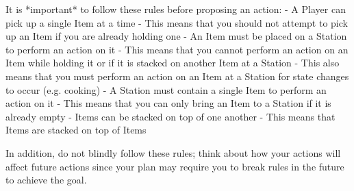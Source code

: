 It is *important* to follow these rules before proposing an action:
    - A Player can pick up a single Item at a time
      - This means that you should not attempt to pick up an Item if you are already holding one
    - An Item must be placed on a Station to perform an action on it
      - This means that you cannot perform an action on an Item while holding it or if it is stacked on another Item at a Station
      - This also means that you must perform an action on an Item at a Station for state changes to occur (e.g. cooking)
    - A Station must contain a single Item to perform an action on it
      - This means that you can only bring an Item to a Station if it is already empty
    - Items can be stacked on top of one another
      - This means that Items are stacked on top of Items
    
    
    In addition, do not blindly follow these rules; think about how your actions will affect future actions since your plan may
    require you to break rules in the future to achieve the goal.
